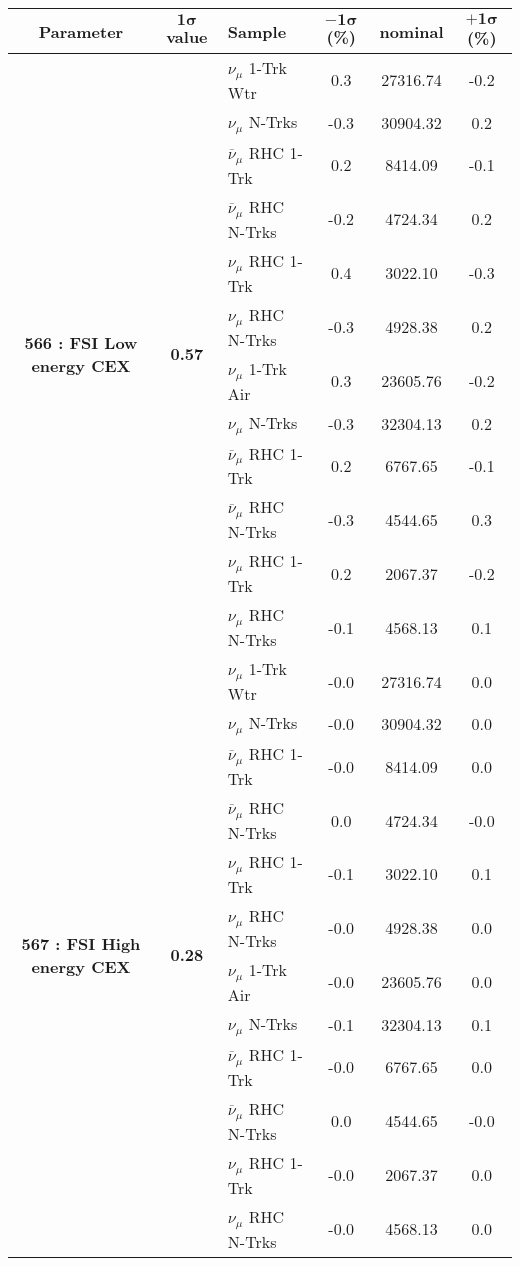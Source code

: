 \addtocounter{table}{-1}
\begin{table}[ht!]
\centering

\begin{tabular}{ c  c  l  c  c  c }
\midrule[1.3pt]
\textbf{Parameter} & \textbf{$\mathbf{1\sigma}$ value} & \textbf{Sample} & \textbf{$\mathbf{-1\sigma}$ (\%)}  &  \textbf{nominal}  &  \textbf{$\mathbf{+1\sigma}$ (\%)} \\
\midrule[1.3pt]
\multirow{12}{*}{\textbf{566 : FSI Low energy CEX}} & \multirow{12}{*}{\textbf{0.57}} & $\nu_\mu$ 1-Trk Wtr &   0.3 &  27316.74 &   -0.2 \\ 
 &  & $\nu_\mu$ N-Trks &   -0.3 &  30904.32 &   0.2 \\ 
 &  & $\overline{\nu}_\mu$ RHC 1-Trk &   0.2 &  8414.09 &   -0.1 \\ 
 &  & $\overline{\nu}_\mu$ RHC N-Trks &   -0.2 &  4724.34 &   0.2 \\ 
 &  & $\nu_\mu$ RHC 1-Trk &   0.4 &  3022.10 &   -0.3 \\ 
 &  & $\nu_\mu$ RHC N-Trks &   -0.3 &  4928.38 &   0.2 \\ 
 &  & $\nu_\mu$ 1-Trk Air &   0.3 &  23605.76 &   -0.2 \\ 
 &  & $\nu_\mu$ N-Trks &   -0.3 &  32304.13 &   0.2 \\ 
 &  & $\overline{\nu}_\mu$ RHC 1-Trk &   0.2 &  6767.65 &   -0.1 \\ 
 &  & $\overline{\nu}_\mu$ RHC N-Trks &   -0.3 &  4544.65 &   0.3 \\ 
 &  & $\nu_\mu$ RHC 1-Trk &   0.2 &  2067.37 &   -0.2 \\ 
 &  & $\nu_\mu$ RHC N-Trks &   -0.1 &  4568.13 &   0.1 \\ 
\midrule[1.3pt]
\multirow{12}{*}{\textbf{567 : FSI High energy CEX}} & \multirow{12}{*}{\textbf{0.28}} & $\nu_\mu$ 1-Trk Wtr &   -0.0 &  27316.74 &   0.0 \\ 
 &  & $\nu_\mu$ N-Trks &   -0.0 &  30904.32 &   0.0 \\ 
 &  & $\overline{\nu}_\mu$ RHC 1-Trk &   -0.0 &  8414.09 &   0.0 \\ 
 &  & $\overline{\nu}_\mu$ RHC N-Trks &   0.0 &  4724.34 &   -0.0 \\ 
 &  & $\nu_\mu$ RHC 1-Trk &   -0.1 &  3022.10 &   0.1 \\ 
 &  & $\nu_\mu$ RHC N-Trks &   -0.0 &  4928.38 &   0.0 \\ 
 &  & $\nu_\mu$ 1-Trk Air &   -0.0 &  23605.76 &   0.0 \\ 
 &  & $\nu_\mu$ N-Trks &   -0.1 &  32304.13 &   0.1 \\ 
 &  & $\overline{\nu}_\mu$ RHC 1-Trk &   -0.0 &  6767.65 &   0.0 \\ 
 &  & $\overline{\nu}_\mu$ RHC N-Trks &   0.0 &  4544.65 &   -0.0 \\ 
 &  & $\nu_\mu$ RHC 1-Trk &   -0.0 &  2067.37 &   0.0 \\ 
 &  & $\nu_\mu$ RHC N-Trks &   -0.0 &  4568.13 &   0.0 \\ 
\midrule[1.3pt]
\end{tabular}
\end{table}

